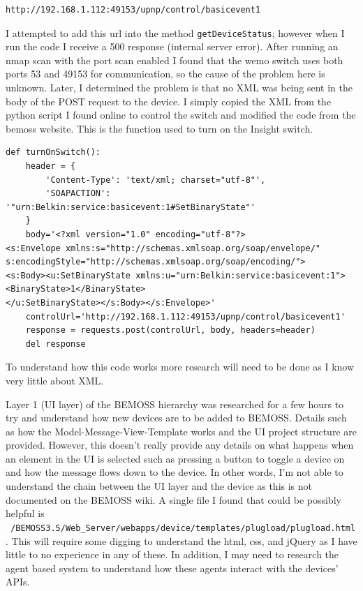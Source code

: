 \documentclass[fontsize=11pt, %
                             paper=letter, %
                             twoside, %
                             captions=tableheading,
                             index=totoc,
                             hyperref]{labbook}
\begin{document}
\begin{addmargin}[0cm]{0cm}
\begin{verbatim}
http://192.168.1.112:49153/upnp/control/basicevent1
\end{verbatim}
I attempted to add this url into the method \texttt{getDeviceStatus}; however when I run the code I receive a 500 response (internal server error). After running an nmap scan with the port scan enabled I found that the wemo switch uses both ports 53 and 49153 for communication, so the cause of the problem here is unknown. Later, I determined the problem is that no XML was being sent in the body of the POST request to the device. I simply copied the XML from the python script I found online to control the switch and modified the code from the bemoss website. This is the function used to turn on the Insight switch.
\begin{Verbatim}[tabsize=4]
def turnOnSwitch():
	header = {
		'Content-Type': 'text/xml; charset="utf-8"',
		'SOAPACTION': '"urn:Belkin:service:basicevent:1#SetBinaryState"'
	}
	body='<?xml version="1.0" encoding="utf-8"?>
<s:Envelope xmlns:s="http://schemas.xmlsoap.org/soap/envelope/" 
s:encodingStyle="http://schemas.xmlsoap.org/soap/encoding/">
<s:Body><u:SetBinaryState xmlns:u="urn:Belkin:service:basicevent:1">
<BinaryState>1</BinaryState>
</u:SetBinaryState></s:Body></s:Envelope>'
	controlUrl='http://192.168.1.112:49153/upnp/control/basicevent1'
	response = requests.post(controlUrl, body, headers=header)
	del response																																										
\end{Verbatim}
To understand how this code works more research will need to be done as I know very little about XML.

Layer 1 (UI layer) of the BEMOSS hierarchy was researched for a few hours to try and understand how new devices are to be added to BEMOSS. Details such as how the 	Model-Message-View-Template works and the UI project structure are provided. However, this doesn't really provide any details on what happens when an element in the UI is selected such as pressing a button to toggle a device on and how the message flows down to the device. In other words, I'm not able to understand the chain between the UI layer and the device as this is not documented on the BEMOSS wiki. A single file I found that could be possibly helpful is \texttt{~/BEMOSS3.5/Web\_Server/webapps/device/templates/plugload/plugload.html}. This will require some digging to understand the html, css, and jQuery as I have little to no experience in any of these. In addition, I may need to research the agent based system to understand how these agents interact with the devices' APIs.   

\end{addmargin}
\end{document}
